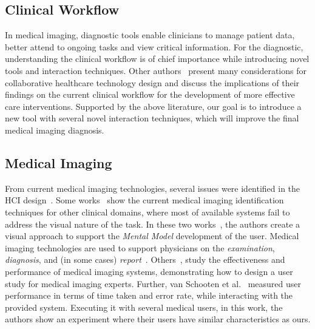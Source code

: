 
\subsection{Clinical Workflow}

In medical imaging, diagnostic tools enable clinicians to manage patient data, better attend to ongoing tasks and view critical information.
For the diagnostic, understanding the clinical workflow is of chief importance while introducing novel tools and interaction techniques.
Other authors~\cite{10.1145/2685553.2699332, 10.5555/2826165.2826187} present many considerations for collaborative healthcare technology design and discuss the implications of their findings on the current clinical workflow for the development of more effective care interventions.
Supported by the above literature, our goal is to introduce a new tool with several novel interaction techniques, which will improve the final medical imaging diagnosis.

\subsection{Medical Imaging}

From current medical imaging technologies, several issues were identified in the HCI design~\cite{Calisto:2017:TTM:3132272.3134111, calisto2017mimbcdui, Igarashi:2016:IVS:2984511.2984537}.
Some works~\cite{Balducci:2018:BQA:3206505.3206555, Rosado:2015:NFS:2826165.2826213} show the current medical imaging identification techniques for other clinical domains, where most of available systems fail to address the visual nature of the task.
In these two works~\cite{Balducci:2018:BQA:3206505.3206555, Rosado:2015:NFS:2826165.2826213}, the authors create a visual approach to support the \textit{Mental Model} development of the user.
Medical imaging technologies are used to support physicians on the \textit{examination}, \textit{diagnosis}, and (in some cases) \textit{report}~\cite{10.1145/2639189.2639256}.
Others~\cite{10.1145/1385569.1385651, 10.1145/1842993.1843023, Sousa:2017:VVR:3025453.3025566}, study the effectiveness and performance of medical imaging systems, demonstrating how to design a user study for medical imaging experts.
Further, van Schooten et al.~\cite{10.1145/1842993.1843023} measured user performance in terms of time taken and error rate, while interacting with the provided system.
Executing it with several medical users, in this work, the authors show an experiment where their users have similar characteristics as ours.

